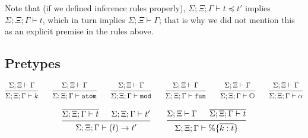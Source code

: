 \documentclass[12pt]{article}
\newcommand{\Gammatop}{\ensuremath{\Xi}}
\newcommand{\Gammabot}{\ensuremath{\Gamma}}
\newcommand{\atom}{\texttt{atom}}
\renewcommand{\mod}{\texttt{mod}}
\newcommand{\fun}{\texttt{fun}}
\begin{document}
Note that (if we defined inference rules properly),
$\Sigma; \Gammatop; \Gammabot \vdash t \preceq t'$ implies $\Sigma; \Gammatop; \Gammabot \vdash t$,
which in turn implies $\Sigma; \Gammatop \vdash \Gammabot$;
that is why we did not mention this as an explicit premise in the rules above.


\subsection{Pretypes}

\[
    \begin{prooftree}
        \hypo { \Sigma; \Gammatop \vdash \Gammabot }
        \infer1{ \Sigma; \Gammatop; \Gammabot \vdash k }
    \end{prooftree}
    \qquad
    \begin{prooftree}
        \hypo { \Sigma; \Gammatop \vdash \Gammabot }
        \infer1{ \Sigma; \Gammatop; \Gammabot \vdash \atom }
    \end{prooftree}
    \qquad
    \begin{prooftree}
        \hypo { \Sigma; \Gammatop \vdash \Gammabot }
        \infer1{ \Sigma; \Gammatop; \Gammabot \vdash \mod }
    \end{prooftree}
    \qquad
    \begin{prooftree}
        \hypo { \Sigma; \Gammatop \vdash \Gammabot }
        \infer1{ \Sigma; \Gammatop; \Gammabot \vdash \fun }
    \end{prooftree}
    \qquad
    \begin{prooftree}
        \hypo { \Sigma; \Gammatop \vdash \Gammabot }
        \infer1{ \Sigma; \Gammatop; \Gammabot \vdash \mathbb{O} }
    \end{prooftree}
    \qquad
    \begin{prooftree}
        \hypo { \Sigma; \Gammatop \vdash \Gammabot }
        \infer1{ \Sigma; \Gammatop; \Gammabot \vdash \alpha }
    \end{prooftree}
\]

\[
    \begin{prooftree}
        \hypo{ \overline{ \Sigma; \Gammatop; \Gammabot \vdash t}}
        \hypo{ \Sigma; \Gammatop; \Gammabot \vdash t'}
        \infer2{ \Sigma; \Gammatop; \Gammabot \vdash (\overline{t}) \rightarrow t' }
    \end{prooftree}
    \qquad
    \begin{prooftree}
        \hypo{ \Sigma; \Gammatop \vdash \Gammabot }
        \hypo{ \overline{ \Sigma; \Gammatop; \Gammabot \vdash t} }
        \infer2{ \Sigma; \Gammatop; \Gammabot \vdash  \%\{ \overline{k: t} \} }
    \end{prooftree}
\]
\end{document}
